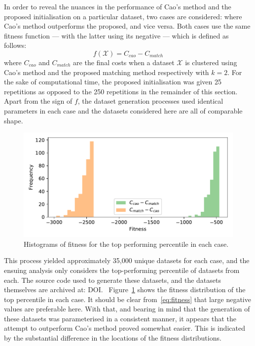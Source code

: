 In order to reveal the nuances in the performance of Cao's method and the
proposed initialisation on a particular dataset, two cases are considered:
where Cao's method outperforms the proposed, and vice versa. Both cases use the
same fitness function --- with the latter using its negative --- which is
defined as follows:
\begin{equation}\label{eq:fitness}
    f\left(\mathcal X\right) = C_{cao} - C_{match}
\end{equation}
where \(C_{cao}\) and \(C_{match}\) are the final costs when a dataset
\(\mathcal X\) is clustered using Cao's method and the proposed matching method
respectively with \(k = 2\). For the sake of computational time, the proposed
initialisation was given 25 repetitions as opposed to the 250 repetitions in the
remainder of this section. Apart from the sign of \(f\), the dataset generation
processes used identical parameters in each case and the datasets considered
here are all of comparable shape.

\begin{figure}
    \centering
    \includegraphics[width=\imgwidth]{fitness.pdf}
    \caption{Histograms of fitness for the top performing percentile in each
             case.}\label{fig:fitness}
\end{figure}

This process yielded approximately 35,000 unique datasets for each case, and the
ensuing analysis only considers the top-performing percentile of datasets from
each. The source code used to generate these datasets, and the datasets
themselves are archived at: DOI.\ %
Figure~\ref{fig:fitness} shows the fitness distribution of the top
percentile in each case. It should be clear from~\eqref{eq:fitness} that large
negative values are preferable here. With that, and bearing in mind that the
generation of these datasets was parameterised in a consistent manner, it
appears that the attempt to outperform Cao's method proved somewhat easier. This
is indicated by the substantial difference in the locations of the fitness
distributions.

